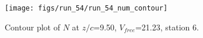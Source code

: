 \begin{figure}[H]
\centering
\texttt{[image: figs/run\_54/run\_54\_num\_contour]}
\caption{Contour plot of $N$ at $z/c$=9.50, $V_{free}$=21.23, station 6.}
\end{figure}


